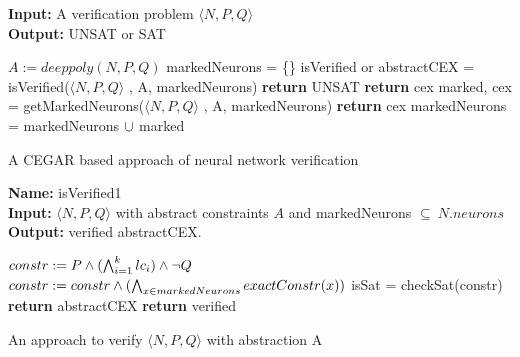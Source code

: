 \begin{algorithm}[t]
  \textbf{Input: } A verification problem $\langle N,P,Q \rangle$ \\
  \textbf{Output: } UNSAT or SAT
  \begin{algorithmic}[1]
    \State $A := deeppoly(N,P,Q)$
    \State markedNeurons = \{\}
      \State isVerified or abstractCEX = isVerified($\langle N,P,Q \rangle$ , A, markedNeurons)
        \State \textbf{return} UNSAT
      \Else
          \State \textbf{return} cex
        \Else
          \State marked, cex = getMarkedNeurons($\langle N,P,Q \rangle$ , A, markedNeurons)
            \State \textbf{return} cex
          \EndIf
          \State markedNeurons = markedNeurons ${\cup}$ marked
        \EndIf
      \EndIf
    \EndWhile
  \end{algorithmic}
  \caption{A CEGAR based approach of neural network verification}
  \label{algo:main}
\end{algorithm}

\begin{algorithm}[t]
  \textbf{Name: } isVerified1 \\
  \textbf{Input: } $\langle N,P,Q \rangle$ with abstract constraints $A$ and markedNeurons $\subseteq ~ N.neurons$ \\
  \textbf{Output: } verified abstractCEX. 
  \begin{algorithmic}[1]
    \State $constr := P \land (\bigwedge_{i=1}^k lc_i)\land \neg Q$
    \State $constr := constr \land (\bigwedge_{x \in markedNeurons} exactConstr(x))$ 
    \State isSat = checkSat(constr)
      \State \textbf{return} abstractCEX
    \Else
      \State \textbf{return} verified
    \EndIf
  \end{algorithmic}
  \caption{An approach to verify $\langle N,P,Q \rangle$ with abstraction A}
  \label{algo:verif1}
\end{algorithm}

